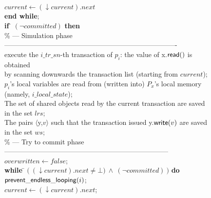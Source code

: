 \begin{figure}[h!]
{{\begin{minipage}[t]{150mm}
\begin{tabbing}
 \> \> $current \leftarrow (\downarrow current).next$\\

 \>     {\bf end while}; \\


 \> {\bf if} \= $(\neg committed)$  {\bf then}\\

\>\> \% --- Simulation phase  ----------------------------------------------------------------------------\\


 \>  \>
   execute the $i\_tr\_sn$-th transaction of $p_i$:  the value of
   {\sc x}.${\sf read}()$  is obtained \\
                
 \>  \>
       by scanning downwards the transaction list 
       (starting from   $current$);  \\ %

 \> \> $p_i$'s local variables are read from (written into) 
             $P_x$'s local memory (namely,   $i\_local\_state$);\\  


\>\> The set of shared objects read by the current 
              transaction  are saved in  the set $\mathit{lrs}$;\\ 


\>\>  The  pairs $\langle${\sc y},$v\rangle$ 
               such that the transaction issued  {\sc y}.${\sf write}(v)$
               are saved in the set $ws$; \\



\>\> \% --- Try to  commit phase  ------------------------------------------------------------------------ \\


 \>\> $overwritten \leftarrow \mathit{false}$; \\ 


 \> \>
      {\bf while} \= $\big(~(\downarrow current).next \neq \bot)
      ~\wedge~ (\neg committed)~\big)$   %
        {\bf do}\\


 \> \>\>   ${\sf prevent\_endless\_looping}(i)$;\\ 
 
 \> \>\>  $current \leftarrow (\downarrow current).next$;\\


\end{tabbing}
\end{minipage}}}
\end{figure}
